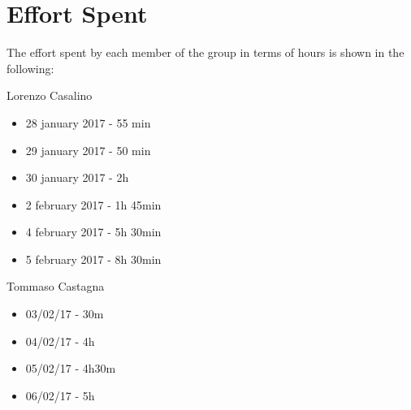 \section{Effort Spent}

The effort spent by each member of the group in terms of hours is shown in the
following:

Lorenzo Casalino

\begin{itemize}
	\item 28 january 2017 - 55 min
	\item 29 january 2017 - 50 min
	\item 30 january 2017 - 2h
	\item 2 february 2017 - 1h 45min
	\item 4 february 2017 - 5h 30min
	\item 5 february 2017 - 8h 30min
\end{itemize}

Tommaso Castagna

\begin{itemize}
	\item 03/02/17 - 30m
	\item 04/02/17 - 4h
	\item 05/02/17 - 4h30m
	\item 06/02/17 - 5h
\end{itemize}
